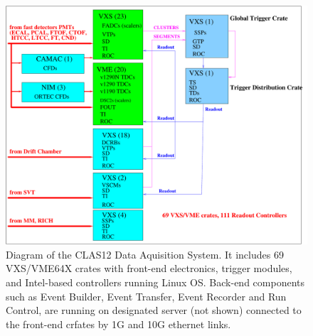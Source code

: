 \begin{figure}[hbt]
	\centering
	\includegraphics[width=1.0\columnwidth,keepaspectratio]{img/CLAS12_HARDWARE_2.pdf}
	\caption{Diagram of the CLAS12 Data Aquisition System. It includes 69 VXS/VME64X crates with front-end electronics, trigger modules, and Intel-based controllers running Linux OS. Back-end components such as Event Builder, Event Transfer, Event Recorder and Run Control, are running on designated server (not shown) connected to the front-end crfates by 1G and 10G ethernet links.}
	\label{fig:DAQdiagram}
\end{figure}

